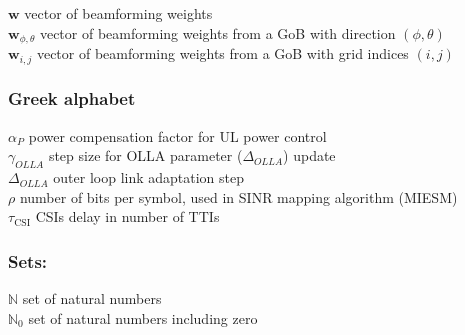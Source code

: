



$\bm{w}$ \mytab vector of beamforming weights \\
$\bm{w}_{\phi, \theta}$ \mytab vector of beamforming weights from a GoB with direction $(\phi, \theta)$ \\
$\bm{w}_{i,j}$ \mytab vector of beamforming weights from a GoB with grid indices $(i,j)$\\



\subsubsection*{Greek alphabet}

$\alpha_P$ \mytab power compensation factor for UL power control\\


$\gamma_{OLLA}$ \mytab step size for OLLA parameter ($\Delta_{OLLA}$) update\\

$\Delta_{OLLA}$ \mytab outer loop link adaptation step\\

$\rho$ \mytab number of bits per symbol, used in SINR mapping algorithm (MIESM)\\

$\tau_\text{CSI}$   \mytab \acsp{CSI} delay in number of \acsp{TTI} \\







\subsubsection*{Sets:}

$\mathbb{N}$ \mytab set of natural numbers \\
$\mathbb{N}_0$ \mytab set of natural numbers including zero\\





